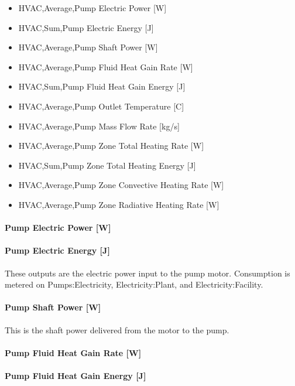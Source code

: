 \begin{itemize}
\item
  HVAC,Average,Pump Electric Power {[}W{]}
\item
  HVAC,Sum,Pump Electric Energy {[}J{]}
\item
  HVAC,Average,Pump Shaft Power {[}W{]}
\item
  HVAC,Average,Pump Fluid Heat Gain Rate {[}W{]}
\item
  HVAC,Sum,Pump Fluid Heat Gain Energy {[}J{]}
\item
  HVAC,Average,Pump Outlet Temperature {[}C{]}
\item
  HVAC,Average,Pump Mass Flow Rate {[}kg/s{]}
\item
  HVAC,Average,Pump Zone Total Heating Rate {[}W{]}
\item
  HVAC,Sum,Pump Zone Total Heating Energy {[}J{]}
\item
  HVAC,Average,Pump Zone Convective Heating Rate {[}W{]}
\item
  HVAC,Average,Pump Zone Radiative Heating Rate {[}W{]}
\end{itemize}

\paragraph{Pump Electric Power {[}W{]}}\label{pump-electric-power-w}

\paragraph{Pump Electric Energy {[}J{]}}\label{pump-electric-energy-j}

These outputs are the electric power input to the pump motor. Consumption is metered on Pumps:Electricity, Electricity:Plant, and Electricity:Facility.

\paragraph{Pump Shaft Power {[}W{]}}\label{pump-shaft-power-w}

This is the shaft power delivered from the motor to the pump.

\paragraph{Pump Fluid Heat Gain Rate {[}W{]}}\label{pump-fluid-heat-gain-rate-w}

\paragraph{Pump Fluid Heat Gain Energy {[}J{]}}\label{pump-fluid-heat-gain-energy-j}

